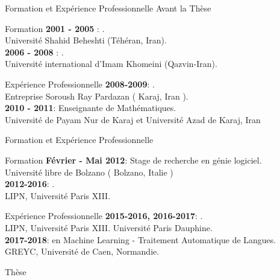 \documentclass{beamer}
\newcommand{\imp}[1]{{\color{red}{#1}}}
\begin{document}
{

\begin{frame}{Formation et Expérience Professionnelle Avant la Thèse}

\begin{block}{Formation}
	\textbf{2001 - 2005} : \imp{Licence en Mathématique}.\\
	Université Shahid Beheshti (Téhéran, Iran).\\
	\textbf{2006 - 2008} : \imp{Master en Mathématique}. \\
	Université international d’Imam Khomeini (Qazvin-Iran).
\end{block}
\begin{block}{Expérience Professionnelle}
\textbf{2008-2009}: \imp{Programmatrice et conceptrice de BDD}.\\
Entreprise Soroush Ray Pardazan ( Karaj, Iran ).\\
\textbf{2010 - 2011}: Enseignante de Mathématiques. \\
Université de Payam Nur de Karaj et Université Azad de Karaj, Iran
\end{block}

\end{frame}

\begin{frame}{Formation et Expérience Professionnelle}

\begin{block}{Formation}
\textbf{Février - Mai 2012}: Stage de recherche en génie logiciel.\\
Université libre de Bolzano ( Bolzano, Italie )\\
\textbf{2012-2016}: \imp{Doctorat en Informatique}.\\
LIPN, Université Paris XIII.
\end{block}

\begin{block}{Expérience Professionnelle}
\textbf{2015-2016, 2016-2017}: \imp{ATER}.\\
LIPN, Université Paris XIII. Université Paris Dauphine.\\
\textbf{2017-2018}: \imp{Post-Doctorante} en Machine Learning - Traitement Automatique de Langues.\\
GREYC, Université de Caen, Normandie. 
\end{block}

\end{frame}
\begin{frame}{Thèse}


\end{frame}}
\end{document}
